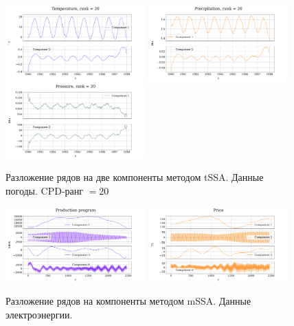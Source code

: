 		\begin{figure}[h!]
			\centering
			\includegraphics[width=0.48\textwidth, keepaspectratio]{../experiments/weather/tssa/figs/decomposition/cpd_rank_20/Temperature.png}
			\includegraphics[width=0.48\textwidth, keepaspectratio]{../experiments/weather/tssa/figs/decomposition/cpd_rank_20/Precipitation.png}
			\includegraphics[width=0.48\textwidth, keepaspectratio]{../experiments/weather/tssa/figs/decomposition/cpd_rank_20/Pressure.png}
			\caption{Разложение рядов на две компоненты методом tSSA. Данные погоды. CPD-ранг $ = 20 $}\label{fig:weather_decomp_tssa}
		\end{figure}
		
		
		\begin{figure}[h!]
			\centering
			\includegraphics[width=0.48\textwidth, keepaspectratio]{../experiments/electricity/mssa/figs/decomposition/manual/grouping_1/Production_program.png}
			\includegraphics[width=0.48\textwidth, keepaspectratio]{../experiments/electricity/mssa/figs/decomposition/manual/grouping_1/Price.png}
			\caption{Разложение рядов на компоненты методом mSSA. Данные электроэнергии.}\label{fig:electr_decomp_mssa}
		\end{figure}
		
